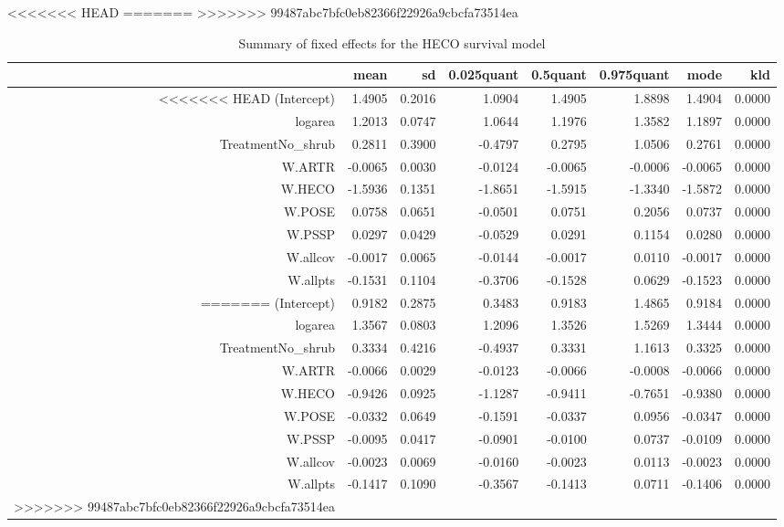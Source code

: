 <<<<<<< HEAD
=======
>>>>>>> 99487abc7bfc0eb82366f22926a9cbcfa73514ea
\begin{table}[ht]
\centering
\caption{Summary of fixed effects for the HECO survival model} 
\label{HECOsurvival}
\begin{tabular}{rrrrrrrr}
  \hline
 & mean & sd & 0.025quant & 0.5quant & 0.975quant & mode & kld \\ 
  \hline
<<<<<<< HEAD
(Intercept) & 1.4905 & 0.2016 & 1.0904 & 1.4905 & 1.8898 & 1.4904 & 0.0000 \\ 
  logarea & 1.2013 & 0.0747 & 1.0644 & 1.1976 & 1.3582 & 1.1897 & 0.0000 \\ 
  TreatmentNo\_shrub & 0.2811 & 0.3900 & -0.4797 & 0.2795 & 1.0506 & 0.2761 & 0.0000 \\ 
  W.ARTR & -0.0065 & 0.0030 & -0.0124 & -0.0065 & -0.0006 & -0.0065 & 0.0000 \\ 
  W.HECO & -1.5936 & 0.1351 & -1.8651 & -1.5915 & -1.3340 & -1.5872 & 0.0000 \\ 
  W.POSE & 0.0758 & 0.0651 & -0.0501 & 0.0751 & 0.2056 & 0.0737 & 0.0000 \\ 
  W.PSSP & 0.0297 & 0.0429 & -0.0529 & 0.0291 & 0.1154 & 0.0280 & 0.0000 \\ 
  W.allcov & -0.0017 & 0.0065 & -0.0144 & -0.0017 & 0.0110 & -0.0017 & 0.0000 \\ 
  W.allpts & -0.1531 & 0.1104 & -0.3706 & -0.1528 & 0.0629 & -0.1523 & 0.0000 \\ 
=======
(Intercept) & 0.9182 & 0.2875 & 0.3483 & 0.9183 & 1.4865 & 0.9184 & 0.0000 \\ 
  logarea & 1.3567 & 0.0803 & 1.2096 & 1.3526 & 1.5269 & 1.3444 & 0.0000 \\ 
  TreatmentNo\_shrub & 0.3334 & 0.4216 & -0.4937 & 0.3331 & 1.1613 & 0.3325 & 0.0000 \\ 
  W.ARTR & -0.0066 & 0.0029 & -0.0123 & -0.0066 & -0.0008 & -0.0066 & 0.0000 \\ 
  W.HECO & -0.9426 & 0.0925 & -1.1287 & -0.9411 & -0.7651 & -0.9380 & 0.0000 \\ 
  W.POSE & -0.0332 & 0.0649 & -0.1591 & -0.0337 & 0.0956 & -0.0347 & 0.0000 \\ 
  W.PSSP & -0.0095 & 0.0417 & -0.0901 & -0.0100 & 0.0737 & -0.0109 & 0.0000 \\ 
  W.allcov & -0.0023 & 0.0069 & -0.0160 & -0.0023 & 0.0113 & -0.0023 & 0.0000 \\ 
  W.allpts & -0.1417 & 0.1090 & -0.3567 & -0.1413 & 0.0711 & -0.1406 & 0.0000 \\ 
>>>>>>> 99487abc7bfc0eb82366f22926a9cbcfa73514ea
   \hline
\end{tabular}
\end{table}

